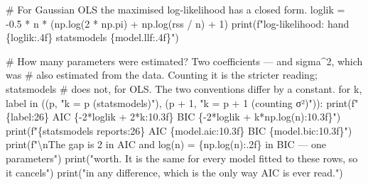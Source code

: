\documentclass[
  letterpaper,
  10pt,
  twoside,
  openright,
  numbers=noenddot,
  chapterprefix=true]{scrbook}
\newenvironment{Shaded}{}{}
\newcommand{\BuiltInTok}[1]{\textcolor[rgb]{0.84,0.23,0.29}{#1}}
\newcommand{\CharTok}[1]{\textcolor[rgb]{0.01,0.18,0.38}{#1}}
\newcommand{\CommentTok}[1]{\textcolor[rgb]{0.42,0.45,0.49}{#1}}
\newcommand{\ControlFlowTok}[1]{\textcolor[rgb]{0.84,0.23,0.29}{#1}}
\newcommand{\DecValTok}[1]{\textcolor[rgb]{0.00,0.36,0.77}{#1}}
\newcommand{\FloatTok}[1]{\textcolor[rgb]{0.00,0.36,0.77}{#1}}
\newcommand{\KeywordTok}[1]{\textcolor[rgb]{0.84,0.23,0.29}{#1}}
\newcommand{\NormalTok}[1]{\textcolor[rgb]{0.14,0.16,0.18}{#1}}
\newcommand{\OperatorTok}[1]{\textcolor[rgb]{0.14,0.16,0.18}{#1}}
\newcommand{\SpecialCharTok}[1]{\textcolor[rgb]{0.00,0.36,0.77}{#1}}
\newcommand{\SpecialStringTok}[1]{\textcolor[rgb]{0.01,0.18,0.38}{#1}}
\newcommand{\StringTok}[1]{\textcolor[rgb]{0.01,0.18,0.38}{#1}}
\begin{document}
\label{check-aic}
\begin{Shaded}
\begin{Highlighting}[]
\CommentTok{\# For Gaussian OLS the maximised log{-}likelihood has a closed form.}
\NormalTok{loglik }\OperatorTok{=} \OperatorTok{{-}}\FloatTok{0.5} \OperatorTok{*}\NormalTok{ n }\OperatorTok{*}\NormalTok{ (np.log(}\DecValTok{2} \OperatorTok{*}\NormalTok{ np.pi) }\OperatorTok{+}\NormalTok{ np.log(rss }\OperatorTok{/}\NormalTok{ n) }\OperatorTok{+} \DecValTok{1}\NormalTok{)}
\BuiltInTok{print}\NormalTok{(}\SpecialStringTok{f"log{-}likelihood: hand }\SpecialCharTok{\{}\NormalTok{loglik}\SpecialCharTok{:.4f\}}\SpecialStringTok{  statsmodels }\SpecialCharTok{\{}\NormalTok{model}\SpecialCharTok{.}\NormalTok{llf}\SpecialCharTok{:.4f\}}\SpecialStringTok{"}\NormalTok{)}

\CommentTok{\# How many parameters were estimated? Two coefficients — and sigma\^{}2, which was}
\CommentTok{\# also estimated from the data. Counting it is the stricter reading; statsmodels}
\CommentTok{\# does not, for OLS. The two conventions differ by a constant.}
\ControlFlowTok{for}\NormalTok{ k, label }\KeywordTok{in}\NormalTok{ ((p, }\StringTok{"k = p     (statsmodels)"}\NormalTok{), (p }\OperatorTok{+} \DecValTok{1}\NormalTok{, }\StringTok{"k = p + 1 (counting σ²)"}\NormalTok{)):}
    \BuiltInTok{print}\NormalTok{(}\SpecialStringTok{f"}\SpecialCharTok{\{}\NormalTok{label}\SpecialCharTok{:26\}}\SpecialStringTok{ AIC }\SpecialCharTok{\{}\OperatorTok{{-}}\DecValTok{2}\OperatorTok{*}\NormalTok{loglik }\OperatorTok{+} \DecValTok{2}\OperatorTok{*}\NormalTok{k}\SpecialCharTok{:10.3f\}}\SpecialStringTok{   BIC }\SpecialCharTok{\{}\OperatorTok{{-}}\DecValTok{2}\OperatorTok{*}\NormalTok{loglik }\OperatorTok{+}\NormalTok{ k}\OperatorTok{*}\NormalTok{np}\SpecialCharTok{.}\NormalTok{log(n)}\SpecialCharTok{:10.3f\}}\SpecialStringTok{"}\NormalTok{)}
\BuiltInTok{print}\NormalTok{(}\SpecialStringTok{f"}\SpecialCharTok{\{}\StringTok{\textquotesingle{}statsmodels reports\textquotesingle{}}\SpecialCharTok{:26\}}\SpecialStringTok{ AIC }\SpecialCharTok{\{}\NormalTok{model}\SpecialCharTok{.}\NormalTok{aic}\SpecialCharTok{:10.3f\}}\SpecialStringTok{   BIC }\SpecialCharTok{\{}\NormalTok{model}\SpecialCharTok{.}\NormalTok{bic}\SpecialCharTok{:10.3f\}}\SpecialStringTok{"}\NormalTok{)}
\BuiltInTok{print}\NormalTok{(}\SpecialStringTok{f"}\CharTok{\textbackslash{}n}\SpecialStringTok{The gap is 2 in AIC and log(n) = }\SpecialCharTok{\{}\NormalTok{np}\SpecialCharTok{.}\NormalTok{log(n)}\SpecialCharTok{:.2f\}}\SpecialStringTok{ in BIC — one parameter\textquotesingle{}s"}\NormalTok{)}
\BuiltInTok{print}\NormalTok{(}\StringTok{"worth. It is the same for every model fitted to these rows, so it cancels"}\NormalTok{)}
\BuiltInTok{print}\NormalTok{(}\StringTok{"in any difference, which is the only way AIC is ever read."}\NormalTok{)}


\end{Highlighting}
\end{Shaded}
\end{document}
